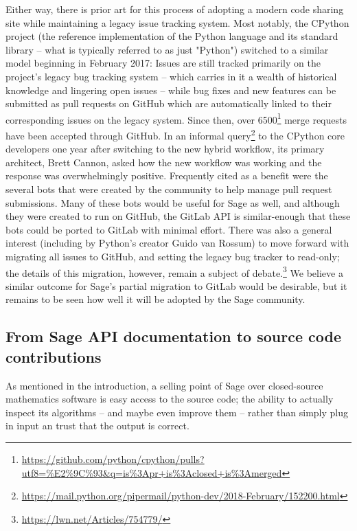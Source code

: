 {Either way, there is prior art for this process of adopting a modern code
sharing site while maintaining a legacy issue tracking system.  Most notably,
the CPython project (the reference implementation of the Python language and
its standard library -- what is typically referred to as just "Python") switched
to a similar model beginning in February 2017: Issues are still tracked
primarily on the project's legacy bug tracking system -- which carries in it a
wealth of historical knowledge and lingering open issues -- while bug fixes and
new features can be submitted as pull requests on GitHub which are
automatically linked to their corresponding issues on the legacy system.  Since
then, over
6500\footnote{\url{https://github.com/python/cpython/pulls?utf8=\%E2\%9C\%93\&q=is\%3Apr+is\%3Aclosed+is\%3Amerged}}
merge requests have been accepted through GitHub.  In an informal
query\footnote{\url{https://mail.python.org/pipermail/python-dev/2018-February/152200.html}}
to the CPython core developers one year after switching to the new hybrid
workflow, its primary architect, Brett Cannon, asked how the new workflow was
working and the response was overwhelmingly positive.  Frequently cited as a
benefit were the several bots that were created by the community to help manage
pull request submissions.  Many of these bots would be useful for Sage as well,
and although they were created to run on GitHub, the GitLab API is
similar-enough that these bots could be ported to GitLab with minimal effort.
There was also a general interest (including by Python's creator Guido van
Rossum) to move forward with migrating all issues to GitHub, and setting the
legacy bug tracker to read-only; the details of this migration, however, remain
a subject of debate.\footnote{\url{https://lwn.net/Articles/754779/}}  We
believe a similar outcome for Sage's partial migration to GitLab would be
desirable, but it remains to be seen how well it will be adopted by the Sage
community.


\hypertarget{source-in-documentation}{%
\subsection{From Sage API documentation to source code contributions}\label{source-in-documentation}}

As mentioned in the introduction, a selling point of Sage over closed-source
mathematics software is easy access to the source code; the ability to actually
inspect its algorithms -- and maybe even improve them -- rather than simply plug in
input an trust that the output is correct.

}
